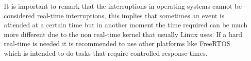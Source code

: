 It is important to remark that the interruptions in operating systems cannot be considered real-time interruptions, this implies that sometimes an event is attended at a certain time but in another moment the time required can be much more different due to the non real-time kernel that usually Linux uses. If a hard real-time is needed it is recommended to use other platforms like FreeRTOS which is intended to do tasks that require controlled response times.
